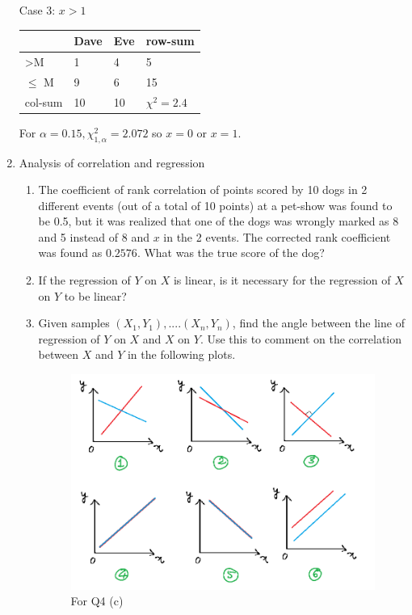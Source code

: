 \documentclass[12pt, oneside]{article}
\begin{document}
\begin{enumerate}
Case 3: $x > 1$
\begin{table}[!ht]
\centering
\begin{tabular}{|l|l|l|l|}
\hline
               & Dave & Eve & row-sum          \\ \hline
\textgreater M & 1   & 4  & 5               \\ \hline
$\le$ M        & 9    & 6   & 15                \\ \hline
col-sum        & 10   & 10  & $\chi^2 = 2.4$ \\ \hline
\end{tabular}
\end{table}

For $\alpha = 0.15, \chi^2_{1,\alpha} = 2.072$ so $x = 0$ or $x = 1$.

\item Analysis of correlation and regression
\begin{enumerate}
    \item The coefficient of rank correlation of points scored by 10 dogs in 2 different events (out of a total of 10 points) at a pet-show was found to be 0.5, but it was realized that one of the dogs was wrongly marked as 8 and 5 instead of 8 and $x$ in the 2 events. The corrected rank coefficient was found as $0.2576$. What was the true score of the dog?
    
    \item If the regression of $Y$ on $X$ is linear, is it necessary for the regression of $X$ on $Y$ to be linear? 
    
    \item Given samples $(X_1,Y_1),....(X_n,Y_n)$, find the angle between the line of regression of $Y$ on $X$ and $X$ on $Y$. Use this to comment on the correlation between $X$ and $Y$ in the following plots. 
    \begin{figure}[!ht]
        \centering
        \includegraphics[width=\textwidth]{coorrplots.png}
        \caption{\label{fig:cp} For Q4 (c)}
    \end{figure}
    

\end{enumerate}
\end{enumerate}
\end{document}
